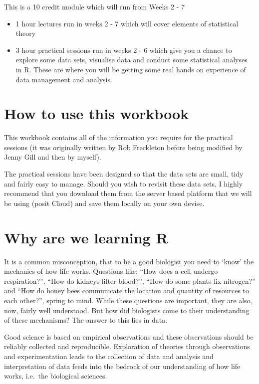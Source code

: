 \documentclass[
]{book}
\providecommand{\tightlist}{%
  \setlength{\itemsep}{0pt}\setlength{\parskip}{0pt}}
\begin{document}
This is a 10 credit module which will run from Weeks 2 - 7

\begin{itemize}
\tightlist
\item
  1 hour lectures run in weeks 2 - 7 which will cover elements of statistical theory
\item
  3 hour practical sessions run in weeks 2 - 6 which give you a chance to explore some data sets, visualise data and conduct some statistical analyses in R. These are where you will be getting some real hands on experience of data management and analysis.
\end{itemize}

\hypertarget{how-to-use-this-workbook}{%
\section{How to use this workbook}\label{how-to-use-this-workbook}}

This workbook contains all of the information you require for the practical sessions (it was originally written by Rob Freckleton before being modified by Jenny Gill and then by myself).

The practical sessions have been designed so that the data sets are small, tidy and fairly easy to manage. Should you wish to revisit these data sets, I highly recommend that you download them from the server based platform that we will be using (posit Cloud) and save them locally on your own devise.

\hypertarget{why-are-we-learning-r}{%
\section{Why are we learning R}\label{why-are-we-learning-r}}

It is a common misconception, that to be a good biologist you need to `know' the mechanics of how life works. Questions like; ``How does a cell undergo respiration?'', ``How do kidneys filter blood?'', ``How do some plants fix nitrogen?'' and ``How do honey bees communicate the location and quantity of resources to each other?'', spring to mind. While these questions are important, they are also, now, fairly well understood. But how did biologists come to their understanding of these mechanisms? The answer to this lies in data.

Good science is based on empirical observations and these observations should be reliably collected and reproducible. Exploration of theories through observations and experimentation leads to the collection of data and analysis and interpretation of data feeds into the bedrock of our understanding of how life works, i.e.~the biological sciences.
\end{document}
